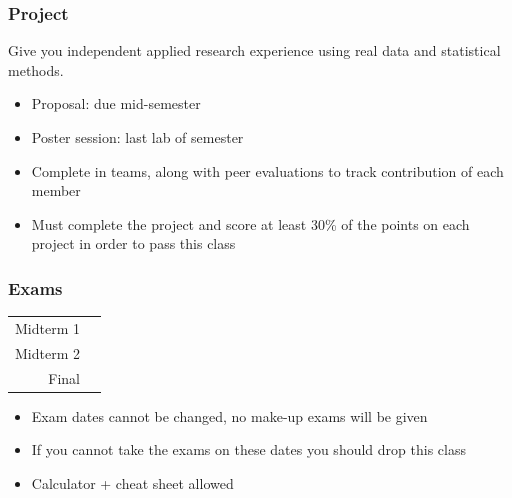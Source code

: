 \documentclass[slidestop,compress,mathserif,12pt,t,professionalfonts,xcolor=table]{beamer}
\begin{document}

\begin{frame}
\frametitle{Project}

 Give you independent applied research experience using real data and 
statistical methods.

\begin{itemize}

\item Proposal: due mid-semester

\item Poster session: last lab of semester

\item Complete in teams, along with peer evaluations to track contribution of each member

\item Must complete the project and score at least 30\% of the points on each 
project in order to pass this class

\end{itemize}

\end{frame}


\begin{frame}
\frametitle{Exams}

\begin{center}
\renewcommand\arraystretch{1.25}
{\footnotesize
\begin{tabular}{ r | l }
Midterm 1								& \ExamADate \\    
Midterm 2 							& \ExamBDate \\    
Final 								 & \FinalDate   
\end{tabular}
}
\end{center}

\begin{itemize}

\item Exam dates cannot be changed, no make-up exams will be given

\item If you cannot take the exams on these dates you should drop this class

\item Calculator + cheat sheet allowed

\end{itemize}

\end{frame}
\end{document}
